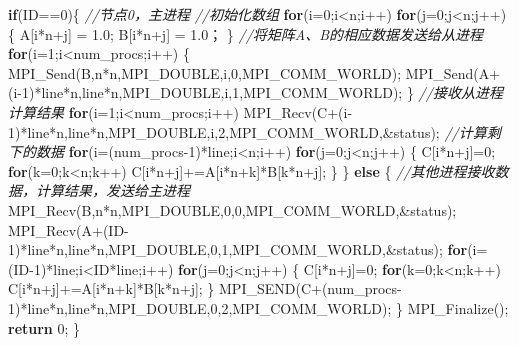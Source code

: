 \documentclass[]{ctexbook}
\newenvironment{Shaded}{\begin{snugshade}}{\end{snugshade}}
\newcommand{\CommentTok}[1]{\textcolor[rgb]{0.56,0.35,0.01}{\textit{#1}}}
\newcommand{\ControlFlowTok}[1]{\textcolor[rgb]{0.13,0.29,0.53}{\textbf{#1}}}
\newcommand{\DecValTok}[1]{\textcolor[rgb]{0.00,0.00,0.81}{#1}}
\newcommand{\FloatTok}[1]{\textcolor[rgb]{0.00,0.00,0.81}{#1}}
\newcommand{\NormalTok}[1]{#1}
\begin{document}
\begin{Shaded}
\begin{Highlighting}[]
    \ControlFlowTok{if}\NormalTok{(ID==}\DecValTok{0}\NormalTok{)\{ }\CommentTok{//节点0，主进程}
        \CommentTok{//初始化数组}
        \ControlFlowTok{for}\NormalTok{(i=}\DecValTok{0}\NormalTok{;i\textless{}n;i++)}
            \ControlFlowTok{for}\NormalTok{(j=}\DecValTok{0}\NormalTok{;j\textless{}n;j++)\{ }
\NormalTok{                A[i*n+j] = }\FloatTok{1.0}\NormalTok{;}
\NormalTok{                B[i*n+j] =  }\FloatTok{1.0}\NormalTok{；}
\NormalTok{            \}}
        \CommentTok{//将矩阵A、B的相应数据发送给从进程}
        \ControlFlowTok{for}\NormalTok{(i=}\DecValTok{1}\NormalTok{;i\textless{}num\_procs;i++) \{}
\NormalTok{            MPI\_Send(B,n*n,MPI\_DOUBLE,i,}\DecValTok{0}\NormalTok{,MPI\_COMM\_WORLD);}
\NormalTok{            MPI\_Send(A+(i{-}}\DecValTok{1}\NormalTok{)*line*n,line*n,MPI\_DOUBLE,i,}\DecValTok{1}\NormalTok{,MPI\_COMM\_WORLD);}
\NormalTok{        \}}
        \CommentTok{//接收从进程计算结果}
        \ControlFlowTok{for}\NormalTok{(i=}\DecValTok{1}\NormalTok{;i\textless{}num\_procs;i++) }
\NormalTok{            MPI\_Recv(C+(i{-}}\DecValTok{1}\NormalTok{)*line*n,line*n,MPI\_DOUBLE,i,}\DecValTok{2}\NormalTok{,MPI\_COMM\_WORLD,\&status);}
        \CommentTok{//计算剩下的数据}
        \ControlFlowTok{for}\NormalTok{(i=(num\_procs{-}}\DecValTok{1}\NormalTok{)*line;i\textless{}n;i++) }
            \ControlFlowTok{for}\NormalTok{(j=}\DecValTok{0}\NormalTok{;j\textless{}n;j++) \{}
\NormalTok{                C[i*n+j]=}\DecValTok{0}\NormalTok{;}
                \ControlFlowTok{for}\NormalTok{(k=}\DecValTok{0}\NormalTok{;k\textless{}n;k++)}
\NormalTok{                    C[i*n+j]+=A[i*n+k]*B[k*n+j];}
\NormalTok{            \}}
\NormalTok{    \} }\ControlFlowTok{else}\NormalTok{ \{}
        \CommentTok{//其他进程接收数据，计算结果，发送给主进程}
\NormalTok{        MPI\_Recv(B,n*n,MPI\_DOUBLE,}\DecValTok{0}\NormalTok{,}\DecValTok{0}\NormalTok{,MPI\_COMM\_WORLD,\&status);}
\NormalTok{        MPI\_Recv(A+(ID{-}}\DecValTok{1}\NormalTok{)*line*n,line*n,MPI\_DOUBLE,}\DecValTok{0}\NormalTok{,}\DecValTok{1}\NormalTok{,MPI\_COMM\_WORLD,\&status);}
        \ControlFlowTok{for}\NormalTok{(i=(ID{-}}\DecValTok{1}\NormalTok{)*line;i\textless{}ID*line;i++)}
            \ControlFlowTok{for}\NormalTok{(j=}\DecValTok{0}\NormalTok{;j\textless{}n;j++) \{}
\NormalTok{                C[i*n+j]=}\DecValTok{0}\NormalTok{;}
                \ControlFlowTok{for}\NormalTok{(k=}\DecValTok{0}\NormalTok{;k\textless{}n;k++)}
\NormalTok{                    C[i*n+j]+=A[i*n+k]*B[k*n+j];}
\NormalTok{            \}}
\NormalTok{        MPI\_SEND(C+(num\_procs{-}}\DecValTok{1}\NormalTok{)*line*n,line*n,MPI\_DOUBLE,}\DecValTok{0}\NormalTok{,}\DecValTok{2}\NormalTok{,MPI\_COMM\_WORLD);}
\NormalTok{    \}}
\NormalTok{    MPI\_Finalize();}
    \ControlFlowTok{return} \DecValTok{0}\NormalTok{;}
\NormalTok{\}}
\end{Highlighting}
\end{Shaded}
\end{document}
